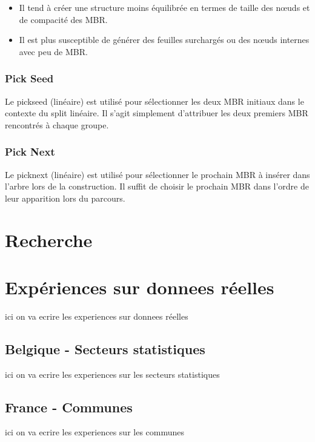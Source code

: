 \documentclass {article}
\begin{document}
\begin{itemize}
    \item Il tend à créer une structure moins équilibrée en termes de taille des nœuds et de
	compacité des MBR.
    \item Il est plus susceptible de générer des feuilles surchargés ou des nœuds internes
	avec peu de MBR.

\end{itemize}

\subsubsection {Pick Seed}

Le pickseed (linéaire) est utilisé pour sélectionner les deux MBR initiaux dans le contexte du split linéaire. 
Il s'agit simplement d'attribuer les deux premiers MBR rencontrés à chaque groupe.



\subsubsection {Pick Next}

Le picknext (linéaire) est utilisé pour sélectionner le prochain MBR à insérer dans l'arbre lors de la construction. 
Il suffit de choisir le prochain MBR dans l'ordre de leur apparition lors du parcours.



\section {Recherche}\label{recherche}

\section {Expériences sur donnees réelles}
ici on va ecrire les experiences sur donnees réelles

\subsection {Belgique - Secteurs statistiques}
ici on va ecrire les experiences sur les secteurs statistiques

\subsection {France - Communes}
ici on va ecrire les experiences sur les communes
\end{document}
